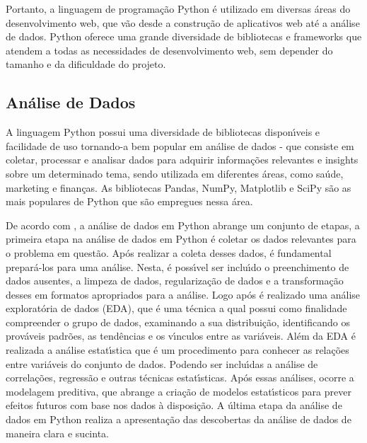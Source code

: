 Portanto, a linguagem de programa\c{c}\~{a}o Python \'{e} utilizado em diversas \'{a}reas do desenvolvimento web, que v\~{a}o desde a constru\c{c}\~{a}o de aplicativos web at\'{e} a an\'{a}lise de dados. Python oferece uma grande diversidade de bibliotecas e frameworks que atendem a todas as necessidades de desenvolvimento web, sem depender do tamanho e da dificuldade do projeto.

		\subsection{An\'{a}lise de Dados }
A linguagem Python possui uma diversidade de bibliotecas dispon\'{\i}veis e facilidade de uso tornando-a bem popular em an\'{a}lise de dados - que consiste em coletar, processar e analisar dados para adquirir informa\c{c}\~{o}es relevantes e insights sobre um determinado tema, sendo utilizada em diferentes \'{a}reas, como sa\'{u}de, marketing e finan\c{c}as. As bibliotecas Pandas, NumPy, Matplotlib e SciPy s\~{a}o as mais populares de Python que s\~{a}o empregues nessa \'{a}rea.

De acordo com \cite{McKinney2023, Chen2018}, a an\'{a}lise de dados em Python abrange um conjunto de etapas, a primeira etapa na an\'{a}lise de dados em Python \'{e} coletar os dados relevantes para o problema em quest\~{a}o. Ap\'{o}s realizar a coleta desses dados, \'{e} fundamental prepar\'{a}-los para uma an\'{a}lise. Nesta, \'{e} poss\'{\i}vel ser inclu\'{\i}do o preenchimento de dados ausentes, a limpeza de dados, regulariza\c{c}\~{a}o de dados e a transforma\c{c}\~{a}o desses em formatos apropriados para a an\'{a}lise. Logo ap\'{o}s \'{e} realizado uma an\'{a}lise explorat\'{o}ria de dados (EDA), que \'{e} uma t\'{e}cnica a qual possui como finalidade compreender o grupo de dados, examinando a sua distribui\c{c}\~{a}o, identificando os prov\'{a}veis padr\~{o}es, as tend\^{e}ncias e os v\'{\i}nculos entre as vari\'{a}veis. Al\'{e}m da EDA \'{e} realizada a an\'{a}lise estat\'{\i}stica que \'{e} um procedimento para conhecer as rela\c{c}\~{o}es entre vari\'{a}veis do conjunto de dados. Podendo ser inclu\'{\i}das a an\'{a}lise de correla\c{c}\~{o}es, regress\~{a}o e outras t\'{e}cnicas estat\'{\i}sticas. Ap\'{o}s essas an\'{a}lises, ocorre a modelagem preditiva, que abrange a cria\c{c}\~{a}o de modelos estat\'{\i}sticos para prever efeitos futuros com base nos dados \`{a} disposi\c{c}\~{a}o. A \'{u}ltima etapa da an\'{a}lise de dados em Python realiza a apresenta\c{c}\~{a}o das descobertas da an\'{a}lise de dados de maneira clara e sucinta.

